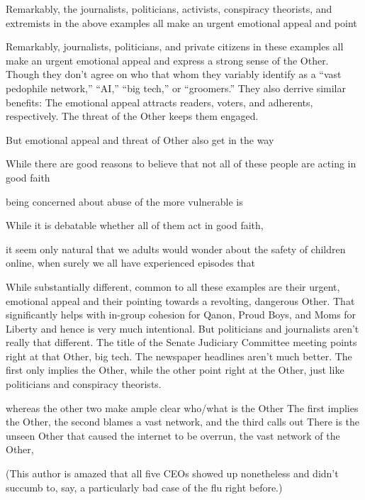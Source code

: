 \documentclass[nonacm,screen]{acmart}
\begin{document}
Remarkably, the journalists, politicians, activists, conspiracy theorists, and
extremists in the above examples all make an urgent emotional appeal and point



Remarkably, journalists, politicians, and private citizens in these examples all
make an urgent emotional appeal and express a strong sense of the Other. Though
they don't agree on who that  whom
they variably identify as a ``vast pedophile network,'' ``AI,'' ``big tech,'' or
``groomers.'' They also derrive similar benefits: The emotional appeal attracts
readers, voters, and adherents, respectively. The threat of the Other keeps them
engaged.

But emotional appeal and threat of Other also get in the way




While there are good reasons to believe that not all of these people
are acting in good faith


being concerned about abuse of the more vulnerable is







While it is debatable whether all of them act in good faith,


it seem
only natural that we adults would wonder about the safety of children online,
when surely we all have experienced episodes that



While substantially different, common to all these examples are their urgent,
emotional appeal and their pointing towards a revolting, dangerous Other. That
significantly helps with in-group cohesion for Qanon, Proud Boys, and Moms for
Liberty and hence is very much intentional. But politicians and journalists
aren't really that different. The title of the Senate Judiciary Committee
meeting points right at that Other, big tech. The newspaper headlines aren't
much better. The first only implies the Other, while the other point right at
the Other, just like politicians and conspiracy theorists.


whereas the other two make ample
clear who/what is the Other The first implies the Other, the second blames a vast network, and
the third calls out  There is the unseen Other that caused the internet to be overrun,
the vast network of the Other,


(This author is amazed that all
five CEOs showed up nonetheless and didn't succumb to, say, a particularly bad
case of the flu right before.)
\end{document}
